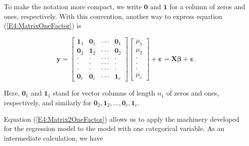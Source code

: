 To make the notation more compact, we write $\mathbf{0}$ and
$\mathbf{1}$ for a column of zeros and ones, respectively. With this
convention, another way to express equation
(\ref{E4:MatrixOneFactor}) is

\begin{center}
\begin{equation}\label{E4:Matrix2OneFactor}
\mathbf{y}=%
\begin{bmatrix}
\mathbf{1}_1 & \mathbf{0}_1 & \cdot \cdot \cdot  & \mathbf{0}%
_1 \\
\mathbf{0}_2 & \mathbf{1}_2 & \cdot \cdot \cdot  & \mathbf{0}%
_2 \\
\cdot  & \cdot  & \cdot \cdot \cdot  & \cdot  \\
\cdot  & \cdot  & \cdot \cdot \cdot  & \cdot  \\
\cdot  & \cdot  & \cdot \cdot \cdot  & \cdot  \\
\mathbf{0}_c & \mathbf{0}_c & \cdot \cdot \cdot  & \mathbf{1}_c
\end{bmatrix}
\begin{bmatrix}
\mu_1 \\
\mu_2 \\
\cdot  \\
\cdot  \\
\cdot  \\
\mu_c%
\end{bmatrix}
+\boldsymbol \varepsilon = \mathbf{X} \boldsymbol \beta +
\boldsymbol \varepsilon .
\end{equation}
\end{center}

\noindent Here, $\mathbf{0}_1$ and $\mathbf{1}_1$ stand for vector
columns of length $n_1$ of zeros and ones, respectively, and
similarly for $\mathbf{0}_2, \mathbf{1}_2, \ldots, \mathbf{0}_c,
\mathbf{1}_c$.

Equation (\ref{E4:Matrix2OneFactor}) allows us to apply the
machinery developed for the regression model to the model with one
categorical variable. As an intermediate calculation, we have

